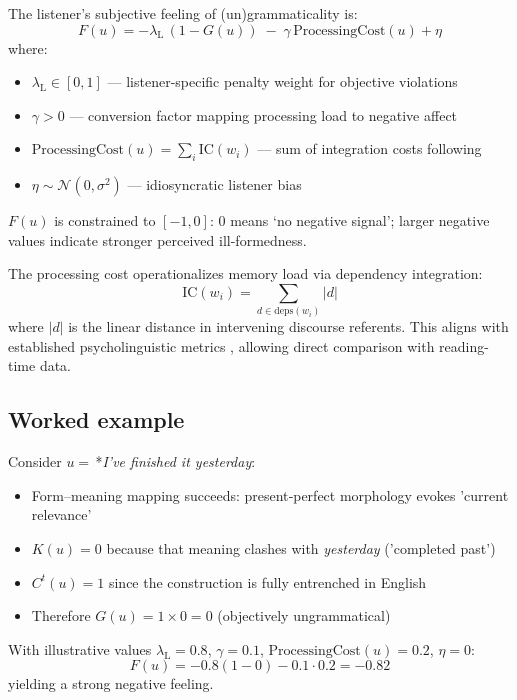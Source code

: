 \documentclass[12pt]{article}
\newcommand{\listener}{\mathrm{L}}
\begin{document}
The listener's subjective feeling of (un)grammaticality is:
\begin{equation}\label{eq:F}
F(u)= -\lambda_{\listener}\,(1-G(u)) \;-\; \gamma\,\text{ProcessingCost}(u) + \eta
\end{equation}
where:
\begin{itemize}
  \item $\lambda_{\listener} \in [0,1]$ — listener-specific penalty weight for objective violations
  \item $\gamma > 0$ — conversion factor mapping processing load to negative affect
  \item $\text{ProcessingCost}(u) = \sum_{i} \text{IC}(w_i)$ — sum of integration costs following \textcite{gibson2000}
  \item $\eta \sim \mathcal{N}(0,\sigma^{2})$ — idiosyncratic listener bias
\end{itemize}

$F(u)$ is constrained to $[-1,0]$: 0 means `no negative signal'; larger negative values indicate stronger perceived ill-formedness.

The processing cost operationalizes memory load via dependency integration:
\begin{equation}
\text{IC}(w_i) = \sum_{d \in \text{deps}(w_i)} |d|
\end{equation}
where $|d|$ is the linear distance in intervening discourse referents. This aligns with established psycholinguistic metrics \parencite{futrell2020}, allowing direct comparison with reading-time data.

\subsection{Worked example}

Consider $u=$\,*\textit{I've finished it yesterday}:

\begin{itemize}
  \item Form–meaning mapping succeeds: present‑perfect morphology evokes 'current relevance'
  \item $K(u)=0$ because that meaning clashes with \textit{yesterday} ('completed past')
  \item $C^{t}(u)=1$ since the construction is fully entrenched in English
  \item Therefore $G(u)=1\times0=0$ (objectively ungrammatical)
\end{itemize}

With illustrative values $\lambda_{\listener}=0.8$, $\gamma=0.1$, $\text{ProcessingCost}(u)=0.2$, $\eta=0$:
\begin{equation}
F(u)=-0.8(1-0)-0.1\cdot0.2=-0.82
\end{equation}
yielding a strong negative feeling.
\end{document}

